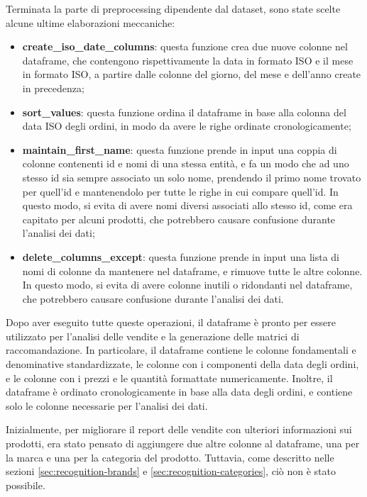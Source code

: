 Terminata la parte di preprocessing dipendente dal dataset, sono state scelte alcune ultime elaborazioni meccaniche:
\begin{itemize}
    \item \textbf{create\_iso\_date\_columns}: questa funzione crea due nuove colonne nel dataframe, che contengono rispettivamente la data in formato ISO e il mese in formato ISO, a partire dalle colonne del giorno, del mese e dell'anno create in precedenza;
    \item \textbf{sort\_values}: questa funzione ordina il dataframe in base alla colonna del data ISO degli ordini, in modo da avere le righe ordinate cronologicamente;
    \item \textbf{maintain\_first\_name}: questa funzione prende in input una coppia di colonne contenenti id e nomi di una stessa entità, e fa un modo che ad uno stesso id sia sempre associato un solo nome, prendendo il primo nome trovato per quell'id e mantenendolo per tutte le righe in cui compare quell'id. In questo modo, si evita di avere nomi diversi associati allo stesso id, come era capitato per alcuni prodotti, che potrebbero causare confusione durante l'analisi dei dati;
    \item \textbf{delete\_columns\_except}: questa funzione prende in input una lista di nomi di colonne da mantenere nel dataframe, e rimuove tutte le altre colonne. In questo modo, si evita di avere colonne inutili o ridondanti nel dataframe, che potrebbero causare confusione durante l'analisi dei dati.
\end{itemize}

Dopo aver eseguito tutte queste operazioni, il dataframe è pronto per essere utilizzato per l'analisi delle vendite e la generazione delle matrici di raccomandazione. In particolare, il dataframe contiene le colonne fondamentali e denominative standardizzate, le colonne con i componenti della data degli ordini, e le colonne con i prezzi e le quantità formattate numericamente. Inoltre, il dataframe è ordinato cronologicamente in base alla data degli ordini, e contiene solo le colonne necessarie per l'analisi dei dati.

Inizialmente, per migliorare il report delle vendite con ulteriori informazioni sui prodotti, era stato pensato di aggiungere due altre colonne al dataframe, una per la marca e una per la categoria del prodotto. Tuttavia, come descritto nelle sezioni \ref{sec:recognition-brands} e \ref{sec:recognition-categories}, ciò non è stato possibile.



